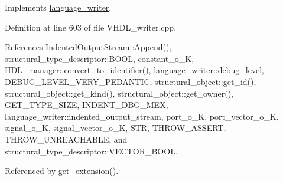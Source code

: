 Implements \hyperlink{classlanguage__writer_a97f0527b8b3b510dc254108379edf440}{language\+\_\+writer}.



Definition at line 603 of file V\+H\+D\+L\+\_\+writer.\+cpp.



References Indented\+Output\+Stream\+::\+Append(), structural\+\_\+type\+\_\+descriptor\+::\+B\+O\+OL, constant\+\_\+o\+\_\+K, H\+D\+L\+\_\+manager\+::convert\+\_\+to\+\_\+identifier(), language\+\_\+writer\+::debug\+\_\+level, D\+E\+B\+U\+G\+\_\+\+L\+E\+V\+E\+L\+\_\+\+V\+E\+R\+Y\+\_\+\+P\+E\+D\+A\+N\+T\+IC, structural\+\_\+object\+::get\+\_\+id(), structural\+\_\+object\+::get\+\_\+kind(), structural\+\_\+object\+::get\+\_\+owner(), G\+E\+T\+\_\+\+T\+Y\+P\+E\+\_\+\+S\+I\+ZE, I\+N\+D\+E\+N\+T\+\_\+\+D\+B\+G\+\_\+\+M\+EX, language\+\_\+writer\+::indented\+\_\+output\+\_\+stream, port\+\_\+o\+\_\+K, port\+\_\+vector\+\_\+o\+\_\+K, signal\+\_\+o\+\_\+K, signal\+\_\+vector\+\_\+o\+\_\+K, S\+TR, T\+H\+R\+O\+W\+\_\+\+A\+S\+S\+E\+RT, T\+H\+R\+O\+W\+\_\+\+U\+N\+R\+E\+A\+C\+H\+A\+B\+LE, and structural\+\_\+type\+\_\+descriptor\+::\+V\+E\+C\+T\+O\+R\+\_\+\+B\+O\+OL.



Referenced by get\+\_\+extension().

